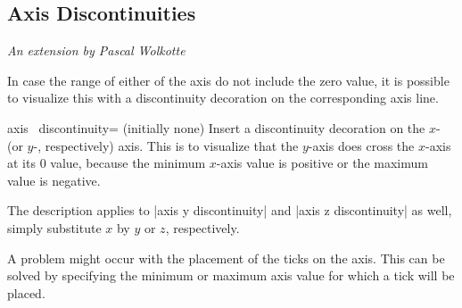 \subsection{Axis Discontinuities}

{\small \emph{An extension by Pascal Wolkotte}}
\vspace{0.4cm}%

\noindent In case the range of either of the axis do not include the zero
value, it is possible to visualize this with a discontinuity decoration on the
corresponding axis line.

\begin{pgfplotsxykey}{axis \x\ discontinuity= (initially none)}
    Insert a discontinuity decoration on the $x$- (or $y$-, respectively) axis.
    This is to visualize that the $y$-axis does cross the $x$-axis at its $0$
    value, because the minimum $x$-axis value is positive or the maximum value
    is negative.

    The description applies to |axis y discontinuity| and
    |axis z discontinuity| as well, simply substitute $x$ by $y$ or $z$,
    respectively.
\begin{codeexample}[]
\end{codeexample}

\begin{codeexample}[]
\end{codeexample}
\end{pgfplotsxykey}

A problem might occur with the placement of the ticks on the axis. This can be
solved by specifying the minimum or maximum axis value for which a tick will be
placed.


